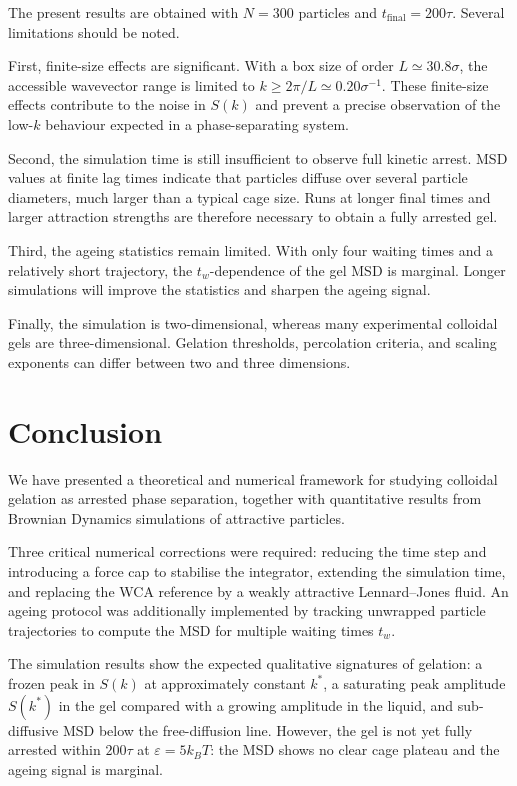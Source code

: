 \documentclass[11pt,a4paper]{article}
\begin{document}
The present results are obtained with $N=300$ particles and $t_{\mathrm{final}}=200\tau$. Several limitations should be noted.

First, finite-size effects are significant. With a box size of order $L\simeq30.8\sigma$, the accessible wavevector range is limited to $k\geq2\pi/L\simeq0.20\sigma^{-1}$. These finite-size effects contribute to the noise in $S(k)$ and prevent a precise observation of the low-$k$ behaviour expected in a phase-separating system.

Second, the simulation time is still insufficient to observe full kinetic arrest. MSD values at finite lag times indicate that particles diffuse over several particle diameters, much larger than a typical cage size. Runs at longer final times and larger attraction strengths are therefore necessary to obtain a fully arrested gel.

Third, the ageing statistics remain limited. With only four waiting times and a relatively short trajectory, the $t_w$-dependence of the gel MSD is marginal. Longer simulations will improve the statistics and sharpen the ageing signal.

Finally, the simulation is two-dimensional, whereas many experimental colloidal gels are three-dimensional. Gelation thresholds, percolation criteria, and scaling exponents can differ between two and three dimensions.

\section{Conclusion}

We have presented a theoretical and numerical framework for studying colloidal gelation as arrested phase separation, together with quantitative results from Brownian Dynamics simulations of attractive particles.

Three critical numerical corrections were required: reducing the time step and introducing a force cap to stabilise the integrator, extending the simulation time, and replacing the WCA reference by a weakly attractive Lennard--Jones fluid. An ageing protocol was additionally implemented by tracking unwrapped particle trajectories to compute the MSD for multiple waiting times $t_w$.

The simulation results show the expected qualitative signatures of gelation: a frozen peak in $S(k)$ at approximately constant $k^*$, a saturating peak amplitude $S(k^*)$ in the gel compared with a growing amplitude in the liquid, and sub-diffusive MSD below the free-diffusion line. However, the gel is not yet fully arrested within $200\tau$ at $\varepsilon=5k_BT$: the MSD shows no clear cage plateau and the ageing signal is marginal.
\end{document}
